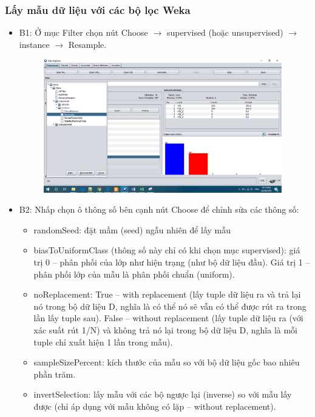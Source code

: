 \subsubsection{Lấy mẫu dữ liệu với các bộ lọc Weka}
\begin{itemize}
	\item B1: Ở mục Filter chọn nút Choose $\rightarrow$ supervised (hoặc unsupervised) $\rightarrow$ instance $\rightarrow$ Resample.
	\begin{figure}[H]
\centering
\includegraphics[width=0.98\textwidth]{6/1.png}
\end{figure}
\item B2: Nhấp chọn ô thông số bên cạnh nút Choose để chỉnh sửa các thông số:
\begin{itemize}
\item	randomSeed: đặt mầm (seed) ngẫu nhiên để lấy mẫu
\item	biasToUniformClass (thông số này chỉ có khi chọn mục supervised): giá trị 0 – phân phối của lớp như hiện trạng (như bộ dữ liệu đầu). Giá trị 1 – phân phối lớp của mẫu là phân phối chuẩn (uniform).
\item	noReplacement: True – with replacement (lấy tuple dữ liệu ra và trả lại nó trong bộ dữ liệu D, nghĩa là có thể nó sẽ vẫn có thể được rút ra trong lần lấy tuple sau). False – without replacement (lấy tuple dữ liệu ra (với xác suất rút 1/N) và không trả nó lại trong bộ dữ liệu D, nghĩa là mỗi tuple chỉ xuất hiện 1 lần trong mẫu).
\item	sampleSizePercent: kích thước của mẫu so với bộ dữ liệu gốc bao nhiêu phần trăm.
\item	invertSelection: lấy mẫu với các bộ ngược lại (inverse) so với mẫu lấy được (chỉ áp dụng với mẫu không có lặp – without replacement).


\end{itemize}
\end{itemize}

